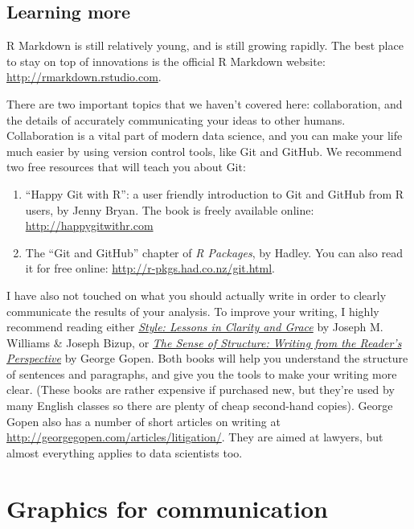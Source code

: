 \documentclass[]{book}
\begin{document}
\section{Learning more}\label{learning-more-2}

R Markdown is still relatively young, and is still growing rapidly. The
best place to stay on top of innovations is the official R Markdown
website: \url{http://rmarkdown.rstudio.com}.

There are two important topics that we haven't covered here:
collaboration, and the details of accurately communicating your ideas to
other humans. Collaboration is a vital part of modern data science, and
you can make your life much easier by using version control tools, like
Git and GitHub. We recommend two free resources that will teach you
about Git:

\begin{enumerate}
\def\labelenumi{\arabic{enumi}.}
\item
  ``Happy Git with R'': a user friendly introduction to Git and GitHub
  from R users, by Jenny Bryan. The book is freely available online:
  \url{http://happygitwithr.com}
\item
  The ``Git and GitHub'' chapter of \emph{R Packages}, by Hadley. You
  can also read it for free online:
  \url{http://r-pkgs.had.co.nz/git.html}.
\end{enumerate}

I have also not touched on what you should actually write in order to
clearly communicate the results of your analysis. To improve your
writing, I highly recommend reading either
\href{https://amzn.com/0134080416}{\emph{Style: Lessons in Clarity and
Grace}} by Joseph M. Williams \& Joseph Bizup, or
\href{https://amzn.com/0205296327}{\emph{The Sense of Structure: Writing
from the Reader's Perspective}} by George Gopen. Both books will help
you understand the structure of sentences and paragraphs, and give you
the tools to make your writing more clear. (These books are rather
expensive if purchased new, but they're used by many English classes so
there are plenty of cheap second-hand copies). George Gopen also has a
number of short articles on writing at
\url{http://georgegopen.com/articles/litigation/}. They are aimed at
lawyers, but almost everything applies to data scientists too.

\hypertarget{graphics-for-communication}{\chapter{Graphics for
communication}\label{graphics-for-communication}}
\end{document}

